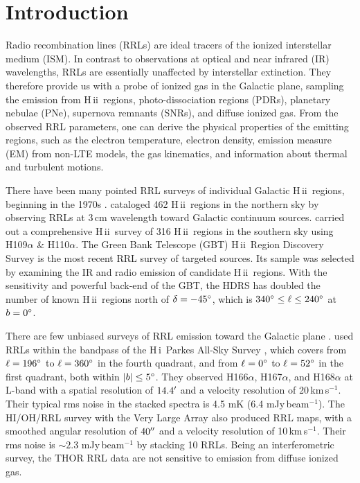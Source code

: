\documentclass[manuscript]{aastex61}
\newcommand{\hii}{{\rm H\,}{{\sc ii}}}
\newcommand{\hi}{{\rm H\,}{{\sc i}}}
\newcommand{\kms}{\,km\,s$^{-1}$}
\begin{document}
\keywords{radio lines: ISM --- \hii\ regions --- catalogs --- surveys}

\section{Introduction} \label{sec_intr}
Radio recombination lines (RRLs) are ideal tracers of the ionized interstellar medium (ISM).
In contrast to observations at optical and near infrared (IR) wavelengths, RRLs are essentially unaffected by interstellar extinction.  They therefore provide us with a probe of ionized gas in the Galactic plane, sampling the emission from \hii\ regions, photo-dissociation regions (PDRs), planetary nebulae (PNe), supernova remnants (SNRs), and diffuse ionized gas.  From the observed RRL parameters, one can derive the physical properties of the emitting regions, such as the electron temperature, electron density, emission measure (EM) from non-LTE models, the gas kinematics, and information about thermal and turbulent motions.

There have been many pointed RRL surveys of individual Galactic \hii\ regions, beginning in the 1970s \citep[e.g.][]{Reifenstein1970,Wilson1970,churchwell1978}.
\citet{Lockman1989} cataloged 462 \hii\ regions in the northern sky by observing RRLs at 3\,cm wavelength toward Galactic continuum sources.
\citet{Caswell1987} carried out a comprehensive \hii\ survey of 316 \hii\ regions in the southern sky using H109$\alpha$ \& H110$\alpha$.
The Green Bank Telescope (GBT) \hii\ Region Discovery Survey \citep[GBT HRDS;][]{Bania2010,Anderson2011,Anderson2015b} is the most recent RRL survey of targeted sources.
Its sample was selected by examining the IR and radio emission of candidate \hii\ regions. 
With the sensitivity and powerful back-end of the GBT, the HDRS has doubled the number of known \hii\ regions north of $\delta=-45\mbox{$^\circ$}$, which is $340\mbox{$^\circ$} \leq \ell \leq 240\mbox{$^\circ$}$ at $b = 0\mbox{$^\circ$}$.

There are few unbiased surveys of RRL emission toward the Galactic plane \citep[e.g.,][]{Lockman1976,Anantharamaiah1986,Roshi2000}.
\citet{Alves2010,Alves2012,Alves2015} used RRLs within the bandpass of the \hi\ Parkes All-Sky Survey \citep[HIPASS;][]{Staveley1996}, which covers from $\ell=196\mbox{$^\circ$}$ to $\ell=360\mbox{$^\circ$}$ in the fourth quadrant, and from $\ell = 0\mbox{$^\circ$}$ to $\ell = 52\mbox{$^\circ$}$ in the first quadrant, both within $|b| \leq 5\mbox{$^\circ$}$.
They observed H166$\alpha$, H167$\alpha$, and H168$\alpha$ at L-band with a spatial resolution of $14.4\mbox{$^\prime$}$ and a velocity resolution of 20\kms. 
Their typical rms noise in the stacked spectra is 4.5 mK (6.4 mJy\,beam$^{-1}$).
The HI/OH/RRL survey with the Very Large Array \citep[THOR;][]{Beuther2016} also produced RRL maps, with a smoothed angular resolution of $40\mbox{$^{\prime\prime}$}$ and a velocity resolution of 10\kms. Their rms noise is $\sim2.3$ mJy\,beam$^{-1}$ by stacking 10 RRLs.
Being an interferometric survey, the THOR RRL data are not sensitive to emission from diffuse ionized gas.
\end{document}
